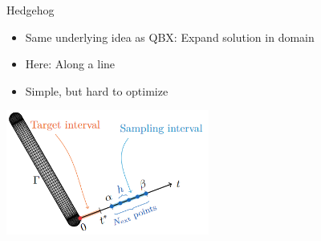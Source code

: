 \documentclass[t]{beamer}
\begin{document}
\begin{frame}{Hedgehog}
  \begin{itemize}
  \item Same underlying idea as QBX: Expand solution in domain
  \item Here: Along a line
  \item Simple, but hard to optimize
  \end{itemize}
  \begin{center}
    \includegraphics[width=0.5\textwidth]{fig/hedgehog}
  \end{center}
\end{frame}
\end{document}
